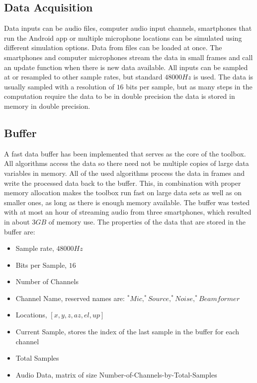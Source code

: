 
\subsection{Data Acquisition}
\label{sec:des_aqc}
Data inputs can be audio files, computer audio input channels, smartphones that run the Android app or multiple microphone locations can be simulated using different simulation options. Data from files can be loaded at once. The smartphones and computer microphones stream the data in small frames and call an update function when there is new data available. All inputs can be sampled at or resampled to other sample rates, but standard $48000 Hz$ is used. The data is usually sampled with a resolution of $16$ bits per sample, but as many steps in the computation require the data to be in double precision the data is stored in memory in double precision.



\subsection{Buffer}
\label{sec:des_buffer}
A fast data buffer has been implemented that serves as the core of the toolbox. All algorithms access the data so there need not be multiple copies of large data variables in memory. All of the used algorithms process the data in frames and write the processed data back to the buffer. This, in combination with proper memory allocation makes the toolbox run fast on large data sets as well as on smaller ones, as long as there is enough memory available. The buffer was tested with at most an hour of streaming audio from three smartphones, which resulted in about $3 GB$ of memory use. \newline
The properties of the data that are stored in the buffer are:
\begin{itemize}
\item Sample rate, $48000 Hz$
\item Bits per Sample, $16$
\item Number of Channels
\item Channel Name, reserved names are: $^*Mic, ^*Source, ^*Noise, ^*Beamformer$
\item Locations, $[x,y,z,az,el,up]$
\item Current Sample, stores the index of the last sample in the buffer for each channel
\item Total Samples
\item Audio Data, matrix of size Number-of-Channels-by-Total-Samples
\end{itemize}

